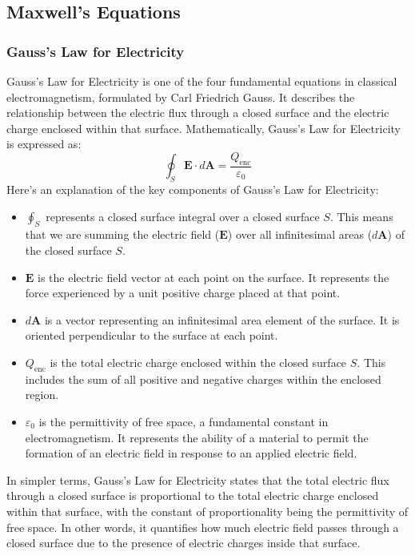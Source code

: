 \lipsum[1-2]

\subsection{Maxwell's Equations}

\subsubsection{Gauss's Law for Electricity}
Gauss's Law for Electricity is one of the four fundamental equations in classical electromagnetism, formulated by Carl Friedrich Gauss.
It describes the relationship between the electric flux through a closed surface and the electric charge enclosed within that surface.
Mathematically, Gauss's Law for Electricity is expressed as:
\[
\oint_S \mathbf{E} \cdot d\mathbf{A} = \frac{Q_{\text{enc}}}{\varepsilon_0}
\]
Here's an explanation of the key components of Gauss's Law for Electricity:
\begin{itemize}
  \item $\oint_S$ represents a closed surface integral over a closed surface $S$. This means that we are summing the electric field ($\mathbf{E}$) over all infinitesimal areas ($d\mathbf{A}$) of the closed surface $S$.
  
  \item $\mathbf{E}$ is the electric field vector at each point on the surface. It represents the force experienced by a unit positive charge placed at that point.
  
  \item $d\mathbf{A}$ is a vector representing an infinitesimal area element of the surface. It is oriented perpendicular to the surface at each point.
  
  \item $Q_{\text{enc}}$ is the total electric charge enclosed within the closed surface $S$. This includes the sum of all positive and negative charges within the enclosed region.
  
  \item $\varepsilon_0$ is the permittivity of free space, a fundamental constant in electromagnetism. It represents the ability of a material to permit the formation of an electric field in response to an applied electric field.
\end{itemize}

In simpler terms, Gauss's Law for Electricity states that the total electric flux through a closed surface is proportional to the total electric charge enclosed within that surface, with the constant of proportionality being the permittivity of free space.
In other words, it quantifies how much electric field passes through a closed surface due to the presence of electric charges inside that surface.


